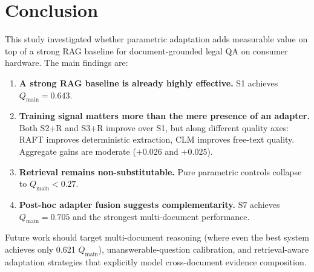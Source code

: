 \newpage
\section{Conclusion}

This study investigated whether parametric adaptation adds measurable value on top of a strong RAG baseline for document-grounded legal QA on consumer hardware. The main findings are:

\begin{enumerate}
    \item \textbf{A strong RAG baseline is already highly effective.} S1 achieves $Q_{\text{main}} = 0.643$.
    \item \textbf{Training signal matters more than the mere presence of an adapter.} Both S2+R and S3+R improve over S1, but along different quality axes: RAFT improves deterministic extraction, CLM improves free-text quality. Aggregate gains are moderate ($+0.026$ and $+0.025$).
    \item \textbf{Retrieval remains non-substitutable.} Pure parametric controls collapse to $Q_{\text{main}} < 0.27$.
    \item \textbf{Post-hoc adapter fusion suggests complementarity.} S7 achieves $Q_{\text{main}} = 0.705$ and the strongest multi-document performance.
\end{enumerate}

Future work should target multi-document reasoning (where even the best system achieves only 0.621 $Q_{\text{main}}$), unanswerable-question calibration, and retrieval-aware adaptation strategies that explicitly model cross-document evidence composition.

